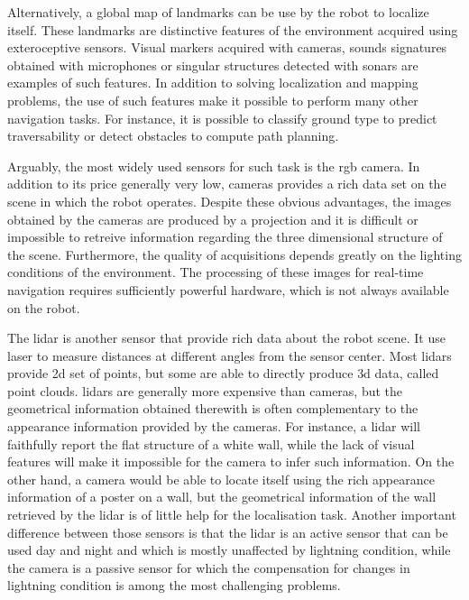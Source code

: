 Alternatively, a global map of landmarks can be use by the robot to localize itself. These landmarks are distinctive features of the environment acquired using exteroceptive sensors. Visual markers acquired with cameras, sounds signatures obtained with microphones or singular structures detected with sonars are examples of such features. In addition to solving localization and mapping problems, the use of such features make it possible to perform many other navigation tasks. For instance, it is possible to classify ground type to predict traversability or detect obstacles to compute path planning.

Arguably, the most widely used sensors for such task is the \gls*{rgb} camera. In addition to its price generally very low, cameras provides a rich data set on the scene in which the robot operates. Despite these obvious advantages, the images obtained by the cameras are produced by a projection and it is difficult or impossible to retreive information regarding the three dimensional structure of the scene. Furthermore, the quality of acquisitions depends greatly on the lighting conditions of the environment. The processing of these images for real-time navigation requires sufficiently powerful hardware, which is not always available on the robot.

The \gls*{lidar} is another sensor that provide rich data about the robot scene. It use laser to measure distances at different angles from the sensor center. Most \gls*{lidar}s provide \gls*{2d} set of points, but some are able to directly produce \gls*{3d} data, called point clouds. \gls*{lidar}s are generally more expensive than cameras, but the geometrical information obtained therewith is often complementary to the appearance information provided by the cameras. For instance, a \gls*{lidar} will faithfully report the flat structure of a white wall, while the lack of visual features will make it impossible for the camera to infer such information. On the other hand, a camera would be able to locate itself using the rich appearance information of a poster on a wall, but the geometrical information of the wall retrieved by the \gls*{lidar} is of little help for the localisation task. Another important difference between those sensors is that the \gls*{lidar} is an active sensor that can be used day and night and which is mostly unaffected by lightning condition, while the camera is a passive sensor for which the compensation for changes in lightning condition is among the most challenging problems. 

